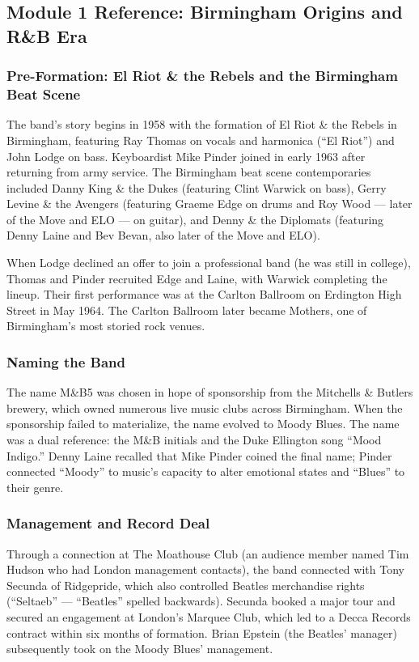\documentclass[11pt,letterpaper]{article}
\begin{document}
\subsection{Module 1 Reference: Birmingham Origins and R\&B Era}

\subsubsection{Pre-Formation: El Riot \& the Rebels and the Birmingham Beat Scene}

The band's story begins in 1958 with the formation of El Riot \& the Rebels in Birmingham, featuring Ray Thomas on vocals and harmonica (``El Riot'') and John Lodge on bass. Keyboardist Mike Pinder joined in early 1963 after returning from army service. The Birmingham beat scene contemporaries included Danny King \& the Dukes (featuring Clint Warwick on bass), Gerry Levine \& the Avengers (featuring Graeme Edge on drums and Roy Wood --- later of the Move and ELO --- on guitar), and Denny \& the Diplomats (featuring Denny Laine and Bev Bevan, also later of the Move and ELO).

When Lodge declined an offer to join a professional band (he was still in college), Thomas and Pinder recruited Edge and Laine, with Warwick completing the lineup. Their first performance was at the Carlton Ballroom on Erdington High Street in May 1964. The Carlton Ballroom later became Mothers, one of Birmingham's most storied rock venues.

\subsubsection{Naming the Band}

The name M\&B5 was chosen in hope of sponsorship from the Mitchells \& Butlers brewery, which owned numerous live music clubs across Birmingham. When the sponsorship failed to materialize, the name evolved to Moody Blues. The name was a dual reference: the M\&B initials and the Duke Ellington song ``Mood Indigo.'' Denny Laine recalled that Mike Pinder coined the final name; Pinder connected ``Moody'' to music's capacity to alter emotional states and ``Blues'' to their genre.

\subsubsection{Management and Record Deal}

Through a connection at The Moathouse Club (an audience member named Tim Hudson who had London management contacts), the band connected with Tony Secunda of Ridgepride, which also controlled Beatles merchandise rights (``Seltaeb'' --- ``Beatles'' spelled backwards). Secunda booked a major tour and secured an engagement at London's Marquee Club, which led to a Decca Records contract within six months of formation. Brian Epstein (the Beatles' manager) subsequently took on the Moody Blues' management.
\end{document}
